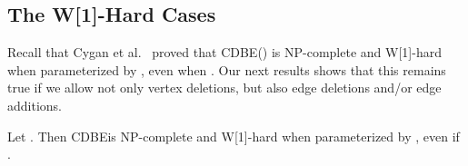 \documentclass[11pt]{llncs}
\newcommand{\cdbe}{{\sc CDBE}}
\newcommand{\NP}{{\sf NP}}
\newcommand{\W}{{\sf W[1]}}
\begin{document}
\subsection{The \W-Hard Cases}\label{s-wund}

Recall that Cygan et al.~\cite{CyganMPPS14} proved that \cdbe() is
\NP-complete and \W-hard when parameterized by , even when
. Our next results shows that this remains true if we allow not
only vertex deletions, but also edge deletions and/or edge additions.

\begin{sloppypar}
\begin{theorem}\label{thm:vertex-dir}
Let . Then \cdbe is
\NP-complete and \W-hard when parameterized by , even if
.
\end{theorem}
\end{sloppypar}
\end{document}
